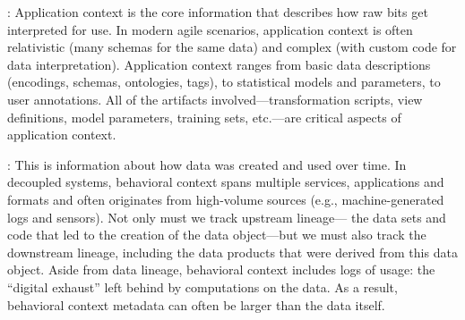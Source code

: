 \documentclass{sig-alternate}
\begin{document}

: Application context is the core information that describes how raw bits get interpreted for use. 
In modern agile scenarios, application context is often relativistic (many schemas for the same data) and complex (with custom code for data interpretation). 
Application context ranges from basic data descriptions (encodings, schemas, ontologies, tags), to statistical models and parameters, to user annotations.  
All of the artifacts involved---transformation scripts, view definitions, model parameters, training sets, etc.---are critical aspects of application context. 

: This is information about how data was created and used over time. 
In decoupled systems, behavioral context spans multiple services, applications and formats and often originates from high-volume sources (e.g., machine-generated logs and sensors).
Not only must we track upstream lineage---
the data sets and code that led to the creation of the data object---but we must also track the 
downstream lineage, including the data products that were derived from this data object. 
Aside from data lineage, behavioral context includes logs of usage: the ``digital exhaust'' left behind by computations on the data. 
As a result, behavioral context metadata can 
often be larger than the data itself. 
\end{document}
